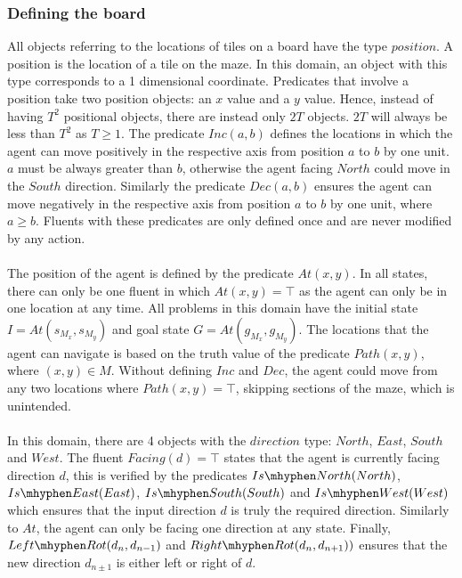 \subsubsection{Defining the board}
All objects referring to the locations of tiles on a board have the type $position$. A position is the location of a tile on the maze. In this domain, an object with this type corresponds to a 1 dimensional coordinate. Predicates that involve a position take two position objects: an $x$ value and a $y$ value. Hence, instead of having $T^2$ positional objects, there are instead only $2T$ objects. $2T$ will always be less than $T^2$ as $T \geq 1$. The predicate $Inc(a, b)$ defines the locations in which the agent can move positively in the respective axis from position $a$ to $b$ by one unit. $a$ must be always greater than $b$, otherwise the agent facing $North$ could move in the $South$ direction. Similarly the predicate $Dec(a, b)$ ensures the agent can move negatively in the respective axis from position $a$ to $b$ by one unit, where $a \geq b$. Fluents with these predicates are only defined once and are never modified by any action.\\\\ The position of the agent is defined by the predicate $At(x, y)$. In all states, there can only be one fluent in which $At(x, y) = \top$ as the agent can only be in one location at any time. All problems in this domain have the initial state $I = At(s_{M_x}, s_{M_y})$ and goal state $G = At(g_{M_x}, g_{M_y})$. The locations that the agent can navigate is based on the truth value of the predicate $Path(x, y)$, where $(x, y) \in M$. Without defining $Inc$ and $Dec$, the agent could move from any two locations where $Path(x, y) = \top$, skipping sections of the maze, which is unintended. \\\\ In this domain, there are 4 objects with the $direction$ type: $North$, $East$, $South$ and $West$. The fluent $Facing(d) = \top$ states that the agent is currently facing direction $d$, this is verified by the predicates $Is\mhyphen North(North)$, $Is\mhyphen East(East)$, $Is\mhyphen South(South)$ and $Is\mhyphen West(West)$ which ensures that the input direction $d$ is truly the required direction. Similarly to $At$, the agent can only be facing one direction at any state. Finally, $Left\mhyphen Rot(d_n, d_{n-1})$ and $Right\mhyphen Rot(d_n, d_{n+1}))$ ensures that the new direction $d_{n\pm 1}$ is either left or right of $d$.

